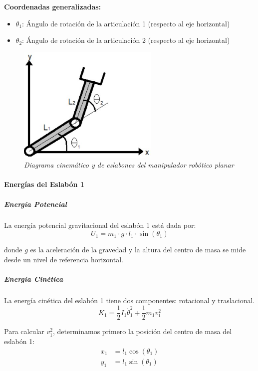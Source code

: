 \textbf{Coordenadas generalizadas:}
\begin{itemize}
    \item $\theta_1$: Ángulo de rotación de la articulación 1 (respecto al eje horizontal)
    \item $\theta_2$: Ángulo de rotación de la articulación 2 (respecto al eje horizontal)
\end{itemize}
\begin{figure}[H]
    \centering
    \includegraphics[width=0.6\textwidth]{img/DCL_brazo.png}
    \caption{\textit{Diagrama cinemático y de eslabones del manipulador robótico planar}}
    \label{fig:DCL_brazo}
\end{figure}
\paragraph{Energías del Eslabón 1}

\subparagraph{Energía Potencial}

La energía potencial gravitacional del eslabón 1 está dada por:
\begin{equation}
U_1 = m_1 \cdot g \cdot l_1 \cdot \sin(\theta_1)
\end{equation}

donde $g$ es la aceleración de la gravedad y la altura del centro de masa se mide desde un nivel de referencia horizontal.

\subparagraph{Energía Cinética}

La energía cinética del eslabón 1 tiene dos componentes: rotacional y traslacional.
\begin{equation}
K_1 = \frac{1}{2} I_1 \dot{\theta}_1^2 + \frac{1}{2} m_1 v_1^2
\end{equation}

Para calcular $v_1^2$, determinamos primero la posición del centro de masa del eslabón 1:
\begin{align}
x_1 &= l_1 \cos(\theta_1) \\
y_1 &= l_1 \sin(\theta_1)
\end{align}

